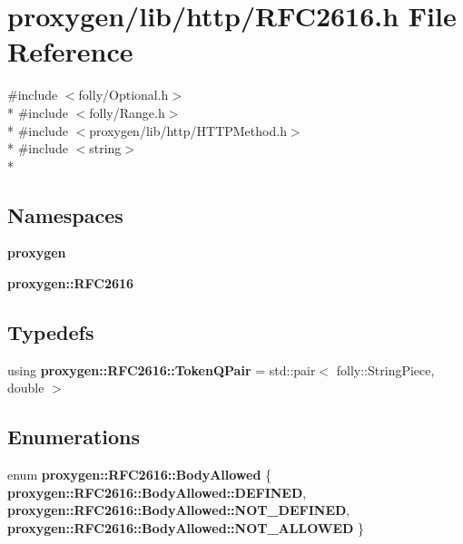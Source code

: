 \section{proxygen/lib/http/\+R\+F\+C2616.h File Reference}
\label{RFC2616_8h}
{\ttfamily \#include $<$folly/\+Optional.\+h$>$}\\*
{\ttfamily \#include $<$folly/\+Range.\+h$>$}\\*
{\ttfamily \#include $<$proxygen/lib/http/\+H\+T\+T\+P\+Method.\+h$>$}\\*
{\ttfamily \#include $<$string$>$}\\*
\subsection*{Namespaces}
\begin{DoxyCompactItemize}
\item 
 {\bf proxygen}
\item 
 {\bf proxygen\+::\+R\+F\+C2616}
\end{DoxyCompactItemize}
\subsection*{Typedefs}
\begin{DoxyCompactItemize}
\item 
using {\bf proxygen\+::\+R\+F\+C2616\+::\+Token\+Q\+Pair} = std\+::pair$<$ folly\+::\+String\+Piece, double $>$
\end{DoxyCompactItemize}
\subsection*{Enumerations}
\begin{DoxyCompactItemize}
\item 
enum {\bf proxygen\+::\+R\+F\+C2616\+::\+Body\+Allowed} \{ {\bf proxygen\+::\+R\+F\+C2616\+::\+Body\+Allowed\+::\+D\+E\+F\+I\+N\+ED}, 
{\bf proxygen\+::\+R\+F\+C2616\+::\+Body\+Allowed\+::\+N\+O\+T\+\_\+\+D\+E\+F\+I\+N\+ED}, 
{\bf proxygen\+::\+R\+F\+C2616\+::\+Body\+Allowed\+::\+N\+O\+T\+\_\+\+A\+L\+L\+O\+W\+ED}
 \}
\end{DoxyCompactItemize}
